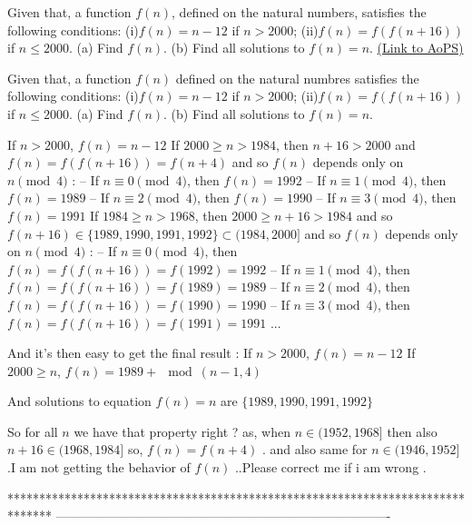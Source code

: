 \begin{problem}
	Given that, a function $f(n)$, defined on the natural numbers, satisfies the following conditions: (i)$f(n)=n-12$ if $n>2000$; (ii)$f(n)=f(f(n+16))$ if $n \leq 2000$.
(a) Find $f(n)$.
(b) Find all solutions to $f(n)=n$.
	\flushright \href{https://artofproblemsolving.com/community/c6h587326}{(Link to AoPS)}
\end{problem}



\begin{solution}
	\begin{tcolorbox}Given that, a function $f(n)$ defined on the natural numbres satisfies the following conditions: (i)$f(n)=n-12$ if $n>2000$; (ii)$f(n)=f(f(n+16))$ if $n \leq 2000$.
(a) Find $f(n)$.
(b) Find all solutions to $f(n)=n$.\end{tcolorbox}
If $n>2000$, $f(n)=n-12$
If $2000\ge n>1984$, then $n+16>2000$ and $f(n)=f(f(n+16))=f(n+4)$ and so $f(n)$ depends only on $n\pmod 4$ :
-- If $n\equiv 0\pmod 4$, then $f(n)=1992$
-- If $n\equiv 1\pmod 4$, then $f(n)=1989$
-- If $n\equiv 2\pmod 4$, then $f(n)=1990$
-- If $n\equiv 3\pmod 4$, then $f(n)=1991$
If $1984\ge n>1968$, then $2000\ge n+16>1984$ and so $f(n+16)\in\{1989,1990,1991,1992\}\subset (1984,2000]$ and so $f(n)$ depends only on $n\pmod 4$ :
-- If $n\equiv 0\pmod 4$, then $f(n)=f(f(n+16))=f(1992)=1992$
-- If $n\equiv 1\pmod 4$, then $f(n)=f(f(n+16))=f(1989)=1989$
-- If $n\equiv 2\pmod 4$, then $f(n)=f(f(n+16))=f(1990)=1990$
-- If $n\equiv 3\pmod 4$, then $f(n)=f(f(n+16))=f(1991)=1991$
...

And it's then easy to get the final result :
If $n>2000$, $f(n)=n-12$
If $2000\ge n$, $f(n)=1989+\mod(n-1,4)$

And solutions to equation $f(n)=n$ are $\{1989,1990,1991,1992\}$
\end{solution}



\begin{solution}
	So for all $n$ we have that property right ?
as, when $n\in (1952,1968]$ then also $n+16\in (1968,1984]$ so, $f(n)=f(n+4)$ . and also same for $n\in (1946,1952]$ .I am not getting the behavior of $f(n)$ ..Please correct me if i am wrong .
\end{solution}
*******************************************************************************
-------------------------------------------------------------------------------

